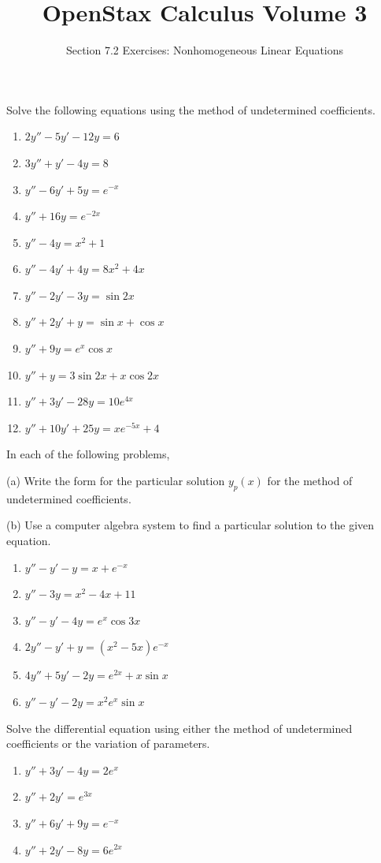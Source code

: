\documentclass{exercises}
\title{OpenStax Calculus Volume 3}
\subtitle{Section 7.2 Exercises: Nonhomogeneous Linear Equations}
\author{}
\date{}
\begin{document}
\maketitle


Solve the following equations using the method of undetermined coefficients.

\begin{enumerate}[start=1]
\item $2y''-5y'-12y=6$
\item $3y''+y'-4y=8$
\item $y''-6y'+5y=e^{-x}$
\item $y''+16y=e^{-2x}$
\item $y''-4y=x^{2}+1$
\item $y''-4y'+4y=8x^{2}+4x$
\item $y''-2y'-3y=\sin 2x$
\item $y''+2y'+y=\sin x+\cos x$
\item $y''+9y=e^{x}\cos x$
\item $y''+y=3\sin 2x+x\cos 2x$
\item $y''+3y'-28y=10e^{4x}$
\item $y''+10y'+25y=xe^{-5x}+4$
\end{enumerate}

In each of the following problems,


(a) Write the form for the particular solution $y_{p}(x)$ for the method of undetermined coefficients.


(b) \techrequired Use a computer algebra system to find a particular solution to the given equation.

\begin{enumerate}[resume]
\item $y''-y'-y=x+e^{-x}$
\item $y''-3y=x^{2}-4x+11$
\item $y''-y'-4y=e^{x}\cos 3x$
\item $2y''-y'+y=(x^{2}-5x)e^{-x}$
\item $4y''+5y'-2y=e^{2x}+x\sin x$
\item $y''-y'-2y=x^{2}e^{x}\sin x$
\end{enumerate}

Solve the differential equation using either the method of undetermined coefficients or the variation of parameters.

\begin{enumerate}[resume]
\item $y''+3y'-4y=2e^{x}$
\item $y''+2y'=e^{3x}$
\item $y''+6y'+9y=e^{-x}$
\item $y''+2y'-8y=6e^{2x}$
\end{enumerate}
\end{document}
